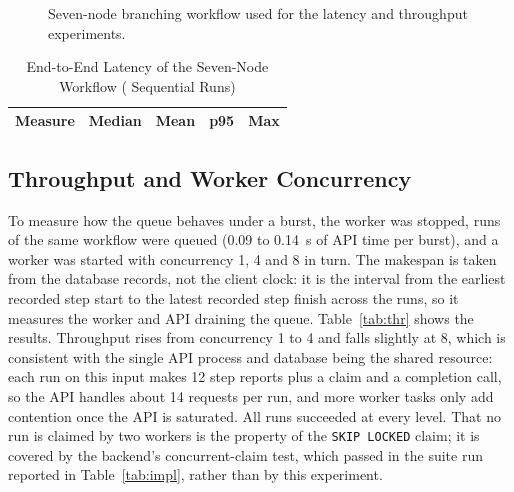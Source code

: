 \documentclass[conference]{IEEEtran}
\begin{document}
\begin{figure}[!htbp]
\centering
{}
\caption{Seven-node branching workflow used for the latency and throughput experiments.}
\label{fig:lat}
\end{figure}

\begin{table}[!htbp]
\centering
\caption{End-to-End Latency of the Seven-Node Workflow (\LATn{} Sequential Runs)}
\label{tab:lat}
\small
\begin{tabular}{L{3.3cm} r r r r}
\toprule
\textbf{Measure} & \textbf{Median} & \textbf{Mean} & \textbf{p95} & \textbf{Max} \\
\midrule

\end{tabular}
\end{table}

\subsection{Throughput and Worker Concurrency}
To measure how the queue behaves under a burst, the worker was stopped, \THRn{} runs of the same workflow were queued (0.09 to 0.14~s of API time per burst), and a worker was started with concurrency 1, 4 and 8 in turn. The makespan is taken from the database records, not the client clock: it is the interval from the earliest recorded step start to the latest recorded step finish across the \THRn{} runs, so it measures the worker and API draining the queue. Table~\ref{tab:thr} shows the results. Throughput rises from concurrency 1 to 4 and falls slightly at 8, which is consistent with the single API process and database being the shared resource: each run on this input makes 12 step reports plus a claim and a completion call, so the API handles about 14 requests per run, and more worker tasks only add contention once the API is saturated. All \THRn{} runs succeeded at every level. That no run is claimed by two workers is the property of the \texttt{SKIP LOCKED} claim; it is covered by the backend's concurrent-claim test, which passed in the suite run reported in Table~\ref{tab:impl}, rather than by this experiment.
\end{document}
